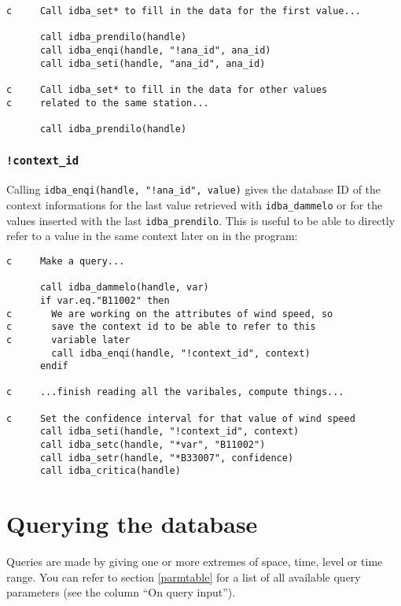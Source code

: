 \documentclass[final,12pt,a4paper,twoside]{book}
\begin{document}
\begin{verbatim}
c     Call idba_set* to fill in the data for the first value...

      call idba_prendilo(handle)
      call idba_enqi(handle, "!ana_id", ana_id)
      call idba_seti(handle, "ana_id", ana_id)

c     Call idba_set* to fill in the data for other values
c     related to the same station...

      call idba_prendilo(handle)
\end{verbatim}

\subsubsection{{\tt !context\_id}}

Calling {\tt idba\_enqi(handle, "!ana\_id", value)} gives the database ID of
the context informations for the last value retrieved with {\tt idba\_dammelo}
or for the values inserted with the last {\tt idba\_prendilo}.  This is useful
to be able to directly refer to a value in the same context later on in the
program:


\begin{verbatim}
c     Make a query...

      call idba_dammelo(handle, var)
      if var.eq."B11002" then
c       We are working on the attributes of wind speed, so
c       save the context id to be able to refer to this
c       variable later
        call idba_enqi(handle, "!context_id", context)
      endif

c     ...finish reading all the varibales, compute things...

c     Set the confidence interval for that value of wind speed
      call idba_seti(handle, "!context_id", context)
      call idba_setc(handle, "*var", "B11002")
      call idba_setr(handle, "*B33007", confidence)
      call idba_critica(handle)
\end{verbatim}

\section {Querying the database}

Queries are made by giving one or more extremes of space, time, level or time
range.  You can refer to section \ref{parmtable} for a list of all available
query parameters (see the column ``On query input'').
\end{document}

